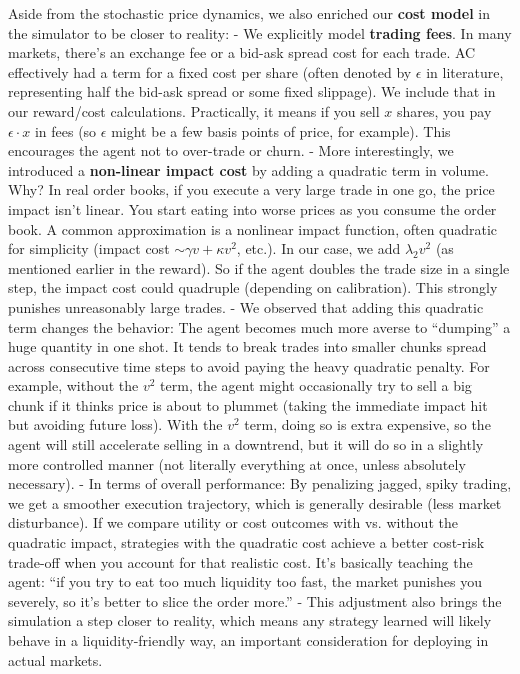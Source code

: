 \documentclass[11pt]{article}
\begin{document}
		Aside from the stochastic price dynamics, we also enriched our \textbf{cost model} in the simulator to be closer to reality:
		- We explicitly model \textbf{trading fees}. In many markets, there’s an exchange fee or a bid-ask spread cost for each trade. AC effectively had a term for a fixed cost per share (often denoted by $\epsilon$ in literature, representing half the bid-ask spread or some fixed slippage). We include that in our reward/cost calculations. Practically, it means if you sell $x$ shares, you pay $\epsilon \cdot x$ in fees (so $\epsilon$ might be a few basis points of price, for example). This encourages the agent not to over-trade or churn.
		- More interestingly, we introduced a \textbf{non-linear impact cost} by adding a quadratic term in volume. Why? In real order books, if you execute a very large trade in one go, the price impact isn’t linear. You start eating into worse prices as you consume the order book. A common approximation is a nonlinear impact function, often quadratic for simplicity (impact cost $\sim \gamma v + \kappa v^2$, etc.). In our case, we add $\lambda_2 v^2$ (as mentioned earlier in the reward). So if the agent doubles the trade size in a single step, the impact cost could quadruple (depending on calibration). This strongly punishes unreasonably large trades.
		- We observed that adding this quadratic term changes the behavior: The agent becomes much more averse to “dumping” a huge quantity in one shot. It tends to break trades into smaller chunks spread across consecutive time steps to avoid paying the heavy quadratic penalty. For example, without the $v^2$ term, the agent might occasionally try to sell a big chunk if it thinks price is about to plummet (taking the immediate impact hit but avoiding future loss). With the $v^2$ term, doing so is extra expensive, so the agent will still accelerate selling in a downtrend, but it will do so in a slightly more controlled manner (not literally everything at once, unless absolutely necessary).
		- In terms of overall performance: By penalizing jagged, spiky trading, we get a smoother execution trajectory, which is generally desirable (less market disturbance). If we compare utility or cost outcomes with vs. without the quadratic impact, strategies with the quadratic cost achieve a better cost-risk trade-off when you account for that realistic cost. It’s basically teaching the agent: “if you try to eat too much liquidity too fast, the market punishes you severely, so it’s better to slice the order more.”
		- This adjustment also brings the simulation a step closer to reality, which means any strategy learned will likely behave in a liquidity-friendly way, an important consideration for deploying in actual markets.
	
\end{document}
